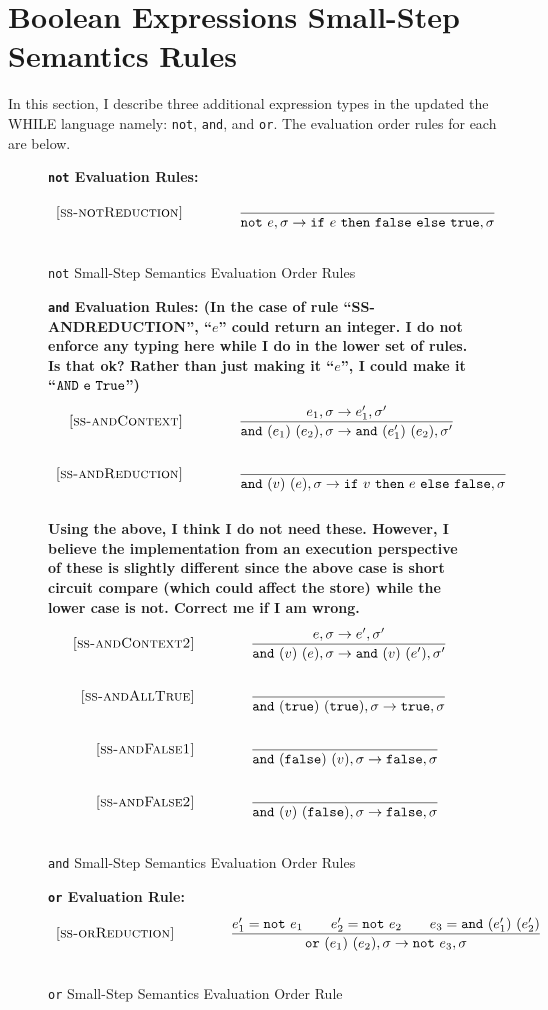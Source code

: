 \documentclass{article}
\newcommand{\ife}[3]{\mbox{\tt if}~{#1}~\mbox{\tt then}~{#2}~\mbox{\tt else}~{#3}}
\newcommand{\note}[1]{\mbox{\tt not}~#1}
\newcommand{\ande}[2]{\mbox{\tt and}~(#1)~(#2)}
\newcommand{\ore}[2]{\mbox{\tt or}~(#1)~(#2)}
\newcommand{\true}{\mbox{\tt true}}
\newcommand{\false}{\mbox{\tt false}}
\begin{document}
\section{Boolean Expressions Small-Step Semantics Rules}


In this section, I describe three additional expression types in the updated the WHILE language namely: {\tt not}, {\tt and}, and {\tt or}.  The evaluation order rules for each are below.

\begin{figure}[H]\label{fig:notRules}
\caption{{\tt not} Small-Step Semantics Evaluation Order Rules}
{\bf {\tt not} Evaluation Rules:} 
\[
\\
\begin{array}{r@{\qquad\qquad}l}
\ssrule{ss-notReduction}{
}{
  \sstep{\note{e}}{\sigma}{\ife{e}{\false}{\true}}{\sigma}
}
\end{array}
\]
\end{figure}

\begin{figure}[H]\label{fig:andRules}
\caption{{\tt and} Small-Step Semantics Evaluation Order Rules}
{\bf {\tt and} Evaluation Rules: (In the case of rule ``SS-ANDREDUCTION'', ``$e$'' could return an integer.  I do not enforce any typing here while I do in the lower set of rules.  Is that ok?  Rather than just making it ``$e$'', I could make it ``${\tt AND~e~True}$'')}
\[
\\
\begin{array}{r@{\qquad\qquad}l}
\ssrule{ss-andContext}{
  \sstep{e_1}{\sigma}{e_1'}{\sigma'}
}{
  \sstep{\ande{e_1}{e_2}}{\sigma}{\ande{e_1'}{e_2}}{\sigma'}
}
\ssrule{ss-andReduction}{
}{
  \sstep{\ande{v}{e}}{\sigma}{\ife{v}{e}{\false}}{\sigma}
}
\end{array}
\]
{\bf Using the above, I think I do not need these.  However, I believe the implementation
from an execution perspective of these is slightly different since the above case is short circuit compare (which could affect the store) while the lower case is not.  Correct me if I am wrong.} 
\[
\\
\begin{array}{r@{\qquad\qquad}l}
\ssrule{ss-andContext2}{
  \sstep{e}{\sigma}{e'}{\sigma'}
}{
  \sstep{\ande{v}{e}}{\sigma}{\ande{v}{e'}}{\sigma'}
}
\ssrule{ss-andAllTrue}{
}{
  \sstep{\ande{\true}{\true}}{\sigma}{\true}{\sigma}
}
\ssrule{ss-andFalse1}{
}{
  \sstep{\ande{\false}{v}}{\sigma}{\false}{\sigma}
}
\ssrule{ss-andFalse2}{
}{
  \sstep{\ande{v}{\false}}{\sigma}{\false}{\sigma}
}
\end{array}
\]
\end{figure}

\begin{figure}[H]\label{fig:orRules}
\caption{{\tt or} Small-Step Semantics Evaluation Order Rule}
{\bf {\tt or} Evaluation Rule:} 
\[
\\
\begin{array}{r@{\qquad\qquad}l}
\ssrule{ss-orReduction}{
  e_1'=\note{e_1} \qquad e_2'=\note{e_2} \qquad e_3=\ande{e_1'}{e_2'}
}{
  \sstep{\ore{e_1}{e_2}}{\sigma}{\note{e_3}}{\sigma}
}
\end{array}
\]
\end{figure}
\end{document}
